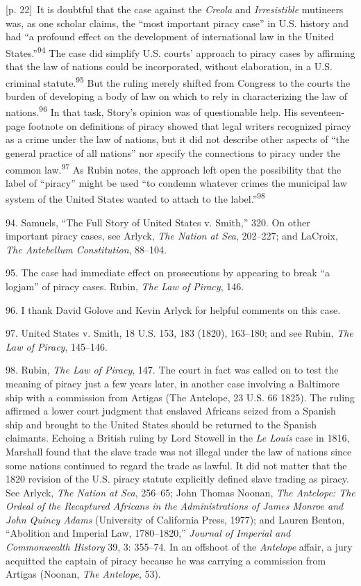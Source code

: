 \documentclass[10pt,a4paper]{article}
\begin{document}
{\scriptsize\color{gray} [p. 22]}\ It is doubtful that the case against the \textit{Creola} and \textit{Irresistible} mutineers was, as one scholar claims, the “most important piracy case” in U.S. history and had “a profound effect on the development of international law in the United States.”\nobreak\textsuperscript{94} The case did simplify U.S. courts’ approach to piracy cases by affirming that the law of nations could be incorporated, without elaboration, in a U.S. criminal statute.\nobreak\textsuperscript{95} But the ruling merely shifted from Congress to the courts the burden of developing a body of law on which to rely in characterizing the law of nations.\nobreak\textsuperscript{96} In that task, Story’s opinion was of questionable help. His seventeen-page footnote on definitions of piracy showed that legal writers recognized piracy as a crime under the law of nations, but it did not describe other aspects of “the general practice of all nations” nor specify the connections to piracy under the common law.\nobreak\textsuperscript{97} As Rubin notes, the approach left open the possibility that the label of “piracy” might be used “to condemn whatever crimes the municipal law system of the United States wanted to attach to the label.”\nobreak\textsuperscript{98}\par{\small 94. Samuels, “The Full Story of United States v. Smith,” 320. On other important piracy cases, see Arlyck, \textit{The Nation at Sea}, 202–227; and LaCroix, \textit{The Antebellum Constitution}, 88–104.\par}{\small 95. The case had immediate effect on prosecutions by appearing to break “a logjam” of piracy cases. Rubin, \textit{The Law of Piracy}, 146.\par}{\small 96. I thank David Golove and Kevin Arlyck for helpful comments on this case.\par}{\small 97. United States v. Smith, 18 U.S. 153, 183 (1820), 163–180; and see Rubin, \textit{The Law of Piracy}, 145–146.\par}{\small 98. Rubin, \textit{The Law of Piracy}, 147. The court in fact was called on to test the meaning of piracy just a few years later, in another case involving a Baltimore ship with a commission from Artigas (The Antelope, 23 U.S. 66 1825). The ruling affirmed a lower court judgment that enslaved Africans seized from a Spanish ship and brought to the United States should be returned to the Spanish claimants. Echoing a British ruling by Lord Stowell in the \textit{Le Louis} case in 1816, Marshall found that the slave trade was not illegal under the law of nations since some nations continued to regard the trade as lawful. It did not matter that the 1820 revision of the U.S. piracy statute explicitly defined slave trading as piracy. See Arlyck, \textit{The Nation at Sea}, 256–65; John Thomas Noonan, \textit{The Antelope: The Ordeal of the Recaptured Africans in the Administrations of James Monroe and John Quincy Adams} (University of California Press, 1977); and Lauren Benton, “Abolition and Imperial Law, 1780–1820,” \textit{Journal of Imperial and Commonwealth History} 39, 3: 355–74. In an offshoot of the \textit{Antelope} affair, a jury acquitted the captain of piracy because he was carrying a commission from Artigas (Noonan, \textit{The Antelope}, 53).\par}
\end{document}
